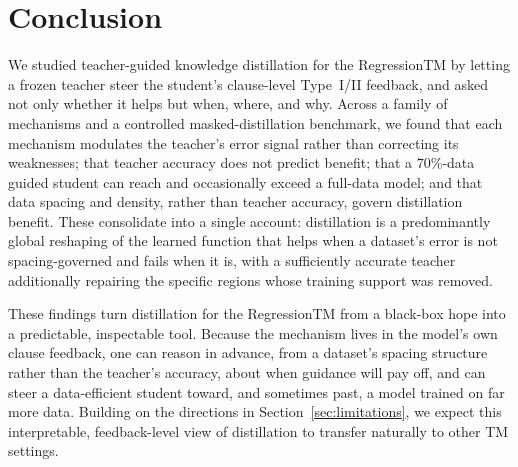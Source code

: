 \section{Conclusion}
\label{sec:conclusion}

We studied teacher-guided knowledge distillation for the RegressionTM by letting a frozen
teacher steer the student's clause-level Type~I/II feedback, and asked not only whether it
helps but when, where, and why. Across a family of mechanisms and a controlled
masked-distillation benchmark, we found that each mechanism modulates the teacher's error
signal rather than correcting its weaknesses; that teacher accuracy does not predict
benefit; that a $70\%$-data guided student can reach and occasionally exceed a full-data
model; and that data spacing and density, rather than teacher accuracy, govern distillation
benefit. These consolidate into a single account: distillation is a predominantly global
reshaping of the learned function that helps when a dataset's error is not spacing-governed
and fails when it is, with a sufficiently accurate teacher additionally repairing the
specific regions whose training support was removed.

These findings turn distillation for the RegressionTM from a black-box hope into a
predictable, inspectable tool. Because the mechanism lives in the model's own clause
feedback, one can reason in advance, from a dataset's spacing structure rather than the
teacher's accuracy, about when guidance will pay off, and can steer a data-efficient student
toward, and sometimes past, a model trained on far more data. Building on the directions in
Section~\ref{sec:limitations}, we expect this interpretable, feedback-level view of
distillation to transfer naturally to other TM settings.
